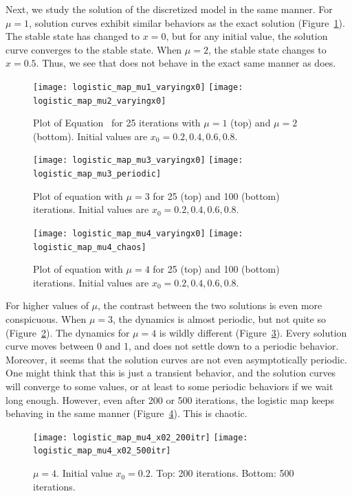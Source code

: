 \documentclass[10pt,twoside,draft]{book}
\begin{document}
Next, we study the solution of the discretized model  in the same manner.
For $\mu = 1$, solution curves exhibit similar behaviors as the exact solution (Figure~\ref{fig:logistic1-2}).
The stable state has changed to $x = 0$, but for any initial value, the solution curve converges to the stable state.
When $\mu = 2$, the stable state changes to $x = 0.5$.
Thus, we see that  does not behave in the exact same manner as  does.
\begin{figure}[p]
    \centering
    \texttt{[image: logistic\_map\_mu1\_varyingx0]}
    \texttt{[image: logistic\_map\_mu2\_varyingx0]}
    \caption{
      Plot of Equation~ for 25 iterations with $\mu = 1$ (top) and $\mu = 2$ (bottom).
      Initial values are $x_0 = 0.2, 0.4, 0.6, 0.8$.
    }
    \label{fig:logistic1-2}
\end{figure}
\begin{figure}[p]
    \centering
    \texttt{[image: logistic\_map\_mu3\_varyingx0]}
    \texttt{[image: logistic\_map\_mu3\_periodic]}
    \caption{
      Plot of equation  with $\mu = 3$ for 25 (top) and 100 (bottom) iterations.
      Initial values are $x_0 = 0.2, 0.4, 0.6, 0.8$.
    }
    \label{fig:logistic3}
\end{figure}
\begin{figure}[p]
  \centering
  \texttt{[image: logistic\_map\_mu4\_varyingx0]}
  \texttt{[image: logistic\_map\_mu4\_chaos]}
  \caption{
    Plot of equation  with $\mu = 4$ for 25 (top) and 100 (bottom) iterations.
    Initial values are $x_0 = 0.2, 0.4, 0.6, 0.8$.
  }
  \label{fig:logistic4}
\end{figure}
For higher values of $\mu$, the contrast between the two solutions is even more conspicuous.
When $\mu = 3$, the dynamics is almost periodic, but not quite so (Figure~\ref{fig:logistic3}).
The dynamics for $\mu = 4$ is wildly different (Figure~\ref{fig:logistic4}).
Every solution curve moves between 0 and 1, and does not settle down to a periodic behavior.
Moreover, it seems that the solution curves are not even asymptotically periodic.
One might think that this is just a transient behavior, and the solution curves will converge to some values, or at least to some periodic behaviors if we wait long enough.
However, even after 200 or 500 iterations, the logistic map keeps behaving in the same manner (Figure~\ref{fig:chaotic_map}).
This is chaotic.
\begin{figure}[p]
  \centering
  \texttt{[image: logistic\_map\_mu4\_x02\_200itr]}
  \texttt{[image: logistic\_map\_mu4\_x02\_500itr]}
  \caption{
    $\mu = 4$. Initial value $x_0 = 0.2$.
    Top: 200 iterations. Bottom: 500 iterations.
  }
  \label{fig:chaotic_map}
\end{figure}
\end{document}

